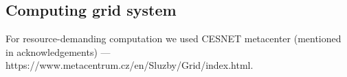 \subsection*{Computing grid system}
For resource-demanding computation we used CESNET metacenter (mentioned in acknowledgements) --- https://www.metacentrum.cz/en/Sluzby/Grid/index.html.






